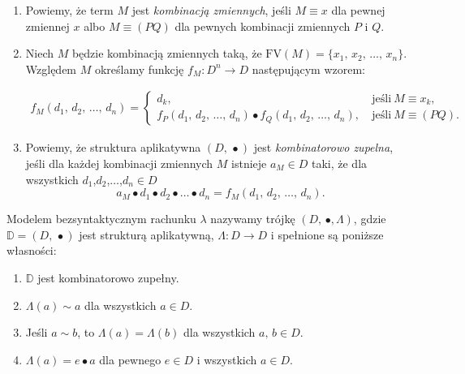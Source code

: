 \begin{definicja}%
\begin{enumerate}
  \setlength\itemsep{0em}
\item
Powiemy, że term \(M\) jest \emph{kombinacją zmiennych}, jeśli \(M\equiv x\) dla pewnej zmiennej \(x\) albo \(M\equiv (PQ)\) dla pewnych kombinacji zmiennych \(P\) i \(Q\). 
\item 
Niech \(M\) będzie kombinacją zmiennych taką, że \(\mathrm{FV}(M)=\{x_1,\,x_2,\,\dots,\,x_n\}\). Względem \(M\) określamy funkcję \(f_M: D^n\to D\) następującym wzorem:

\begin{align*}
f_M (d_1,\,d_2,\,\dots,\,d_n) = \begin{cases}
d_k,\ &\text{jeśli}\ M\equiv x_k, \\
f_P (d_1,\,d_2,\,\dots,\,d_n) \bullet f_Q (d_1,\,d_2,\,\dots,\,d_n),\ & \text{jeśli}\ M\equiv (PQ).
\end{cases}
\end{align*}

\item
Powiemy, że struktura aplikatywna \((D,\,\bullet)\) jest \emph{kombinatorowo zupelna}, jeśli dla każdej kombinacji zmiennych \(M\) istnieje \(a_M\in D\) taki, że dla wszystkich \(d_1\),\(d_2\),\(\dots\),\(d_n\in D\)
\[
  a_M\bullet d_1 \bullet d_2 \bullet \dots \bullet d_n = f_M(d_1,\, d_2,\,\dots,\,d_n).
\]
\end{enumerate}
\end{definicja}

\begin{definicja}%
  Modelem bezsyntaktycznym rachunku \(\lambda\) nazywamy trójkę \((D,\,\bullet, \Lambda)\), gdzie \(\mathbb{D}=(D,\,\bullet)\) jest strukturą aplikatywną, \(\Lambda: D \to D\) i spełnione są poniższe własności:
  \begin{enumerate}[label={(\alph*)}, ref={(\alph*)}]
  \setlength\itemsep{0em}
    \item \(\mathbb{D}\) jest kombinatorowo zupełny.
    \item \(\Lambda (a) \sim a\) dla wszystkich \(a\in D\).
    \item Jeśli \(a\sim b\), to \(\Lambda(a) = \Lambda(b)\) dla wszystkich \(a,\,b\in D\).
    \item \(\Lambda(a)=e\bullet a\) dla pewnego \(e\in D\) i wszystkich \(a\in D\).
  \end{enumerate}
\end{definicja}

